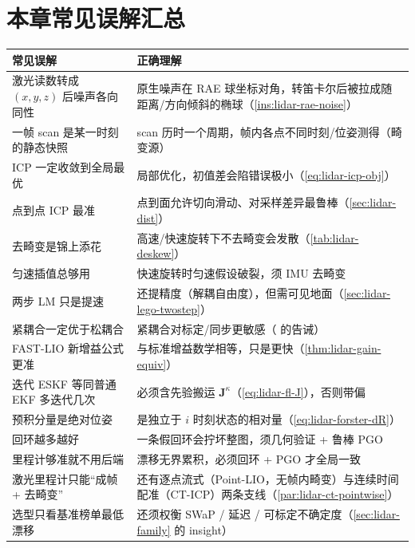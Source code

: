 \section*{本章常见误解汇总}
\begin{table}[H]\centering\small
\begin{tabular}{p{} p{}}
\toprule
\textbf{常见误解} & \textbf{正确理解} \\
\midrule
激光读数转成 $(x,y,z)$ 后噪声各向同性 & 原生噪声在 RAE 球坐标对角，转笛卡尔后被拉成随距离/方向倾斜的椭球（\cref{ins:lidar-rae-noise}）\\
一帧 scan 是某一时刻的静态快照 & scan 历时一个周期，帧内各点不同时刻/位姿测得（畸变源）\\
ICP 一定收敛到全局最优 & 局部优化，初值差会陷错误极小（\cref{eq:lidar-icp-obj}）\\
点到点 ICP 最准 & 点到面允许切向滑动、对采样差异最鲁棒（\cref{sec:lidar-dist}）\\
去畸变是锦上添花 & 高速/快速旋转下不去畸变会发散（\cref{tab:lidar-deskew}）\\
匀速插值总够用 & 快速旋转时匀速假设破裂，须 IMU 去畸变\\
两步 LM 只是提速 & 还提精度（解耦自由度），但需可见地面（\cref{sec:lidar-lego-twostep}）\\
紧耦合一定优于松耦合 & 紧耦合对标定/同步更敏感（\cite{carlone2026handbook} 的告诫）\\
FAST-LIO 新增益公式更准 & 与标准增益数学相等，只是更快（\cref{thm:lidar-gain-equiv}）\\
迭代 ESKF 等同普通 EKF 多迭代几次 & 必须含先验搬运 $\mathbf{J}^\kappa$（\cref{eq:lidar-fl-J}），否则带偏\\
预积分量是绝对位姿 & 是独立于 $i$ 时刻状态的相对量（\cref{eq:lidar-forster-dR}）\\
回环越多越好 & 一条假回环会拧坏整图，须几何验证 + 鲁棒 PGO\\
里程计够准就不用后端 & 漂移无界累积，必须回环 + PGO 才全局一致\\
激光里程计只能“成帧 + 去畸变” & 还有逐点流式（Point-LIO，无帧内畸变）与连续时间配准（CT-ICP）两条支线（\cref{par:lidar-ct-pointwise}）\\
选型只看基准榜单最低漂移 & 还须权衡 SWaP / 延迟 / 可标定不确定度（\cref{sec:lidar-family} 的 insight）\\
\bottomrule
\end{tabular}
\end{table}

